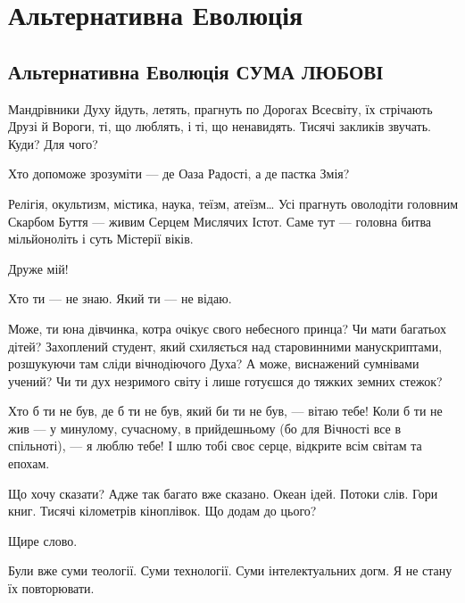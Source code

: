  
 

\section{Альтернативна Еволюція}



\subsection{Альтернативна Еволюція СУМА ЛЮБОВІ}

Мандрівники Духу йдуть, летять, прагнуть по Дорогах Всесвіту, їх стрічають
Друзі й Вороги, ті, що люблять, і ті, що ненавидять. Тисячі закликів звучать.
Куди? Для чого?

Хто допоможе зрозуміти — де Оаза Радості, а де пастка Змія?

Релігія, окультизм, містика, наука, теїзм, атеїзм… Усі прагнуть оволодіти
головним Скарбом Буття — живим Серцем Мислячих Істот. Саме тут — головна битва
мільйоноліть і суть Містерії віків.

Друже мій!

Хто ти — не знаю. Який ти — не відаю.

Може, ти юна дівчинка, котра очікує свого небесного принца? Чи мати багатьох
дітей? Захоплений студент, який схиляється над старовинними манускриптами,
розшукуючи там сліди вічнодіючого Духа? А може, виснажений сумнівами учений? Чи
ти дух незримого світу і лише готуєшся до тяжких земних стежок?

Хто б ти не був, де б ти не був, який би ти не був, — вітаю тебе! Коли б ти не
жив — у минулому, сучасному, в прийдешньому (бо для Вічності все в спільноті),
— я люблю тебе! І шлю тобі своє серце, відкрите всім світам та епохам.

Що хочу сказати? Адже так багато вже сказано. Океан ідей. Потоки слів. Гори книг. Тисячі кілометрів кіноплівок. Що додам до цього?

Щире слово.

Були вже суми теології. Суми технології. Суми інтелектуальних догм. Я не стану
їх повторювати.

